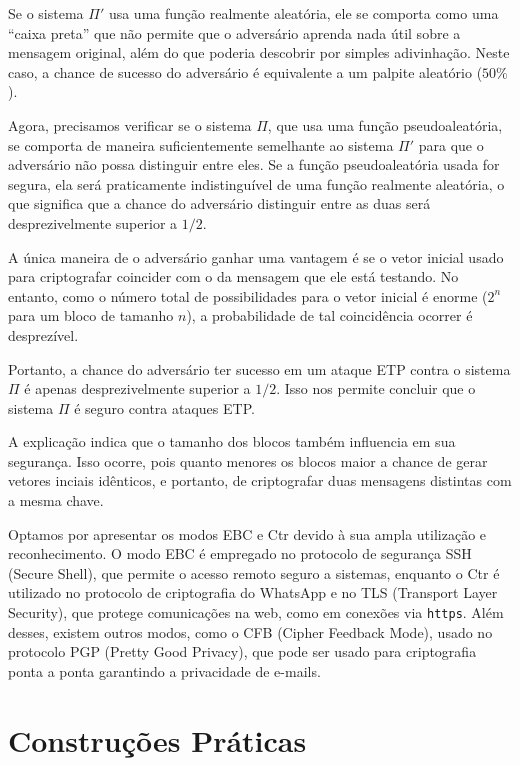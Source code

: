 Se o sistema $\Pi'$ usa uma função realmente aleatória, ele se comporta como uma ``caixa preta'' que não permite que o adversário aprenda nada útil sobre a mensagem original, além do que poderia descobrir por simples adivinhação.
Neste caso, a chance de sucesso do adversário é equivalente a um palpite aleatório ($50\%$).

Agora, precisamos verificar se o sistema $\Pi$, que usa uma função pseudoaleatória, se comporta de maneira suficientemente semelhante ao sistema $\Pi'$ para que o adversário não possa distinguir entre eles.
Se a função pseudoaleatória usada for segura, ela será praticamente indistinguível de uma função realmente aleatória, o que significa que a chance do adversário distinguir entre as duas será desprezivelmente superior a $1/2$.

A única maneira de o adversário ganhar uma vantagem é se o vetor inicial usado para criptografar coincider com o da mensagem que ele está testando.
No entanto, como o número total de possibilidades para o vetor inicial é enorme ($2^n$ para um bloco de tamanho $n$), a probabilidade de tal coincidência ocorrer é desprezível.

Portanto, a chance do adversário ter sucesso em um ataque ETP contra o sistema $\Pi$ é apenas desprezivelmente superior a $1/2$.
Isso nos permite concluir que o sistema $\Pi$ é seguro contra ataques ETP.

A explicação indica que o tamanho dos blocos também influencia em sua segurança.
Isso ocorre, pois quanto menores os blocos maior a chance de gerar vetores inciais idênticos, e portanto, de criptografar duas mensagens distintas com a mesma chave.

Optamos por apresentar os modos EBC e Ctr devido à sua ampla utilização e reconhecimento.
O modo EBC é empregado no protocolo de segurança SSH (Secure Shell), que permite o acesso remoto seguro a sistemas, enquanto o Ctr é utilizado no protocolo de criptografia do WhatsApp e no TLS (Transport Layer Security), que protege comunicações na web, como em conexões via {\tt https}.
Além desses, existem outros modos, como o CFB (Cipher Feedback Mode), usado no protocolo PGP (Pretty Good Privacy), que pode ser usado para criptografia ponta a ponta garantindo a privacidade de e-mails.

\section{Construções Práticas}
\label{sec:construcoes-praticas}

